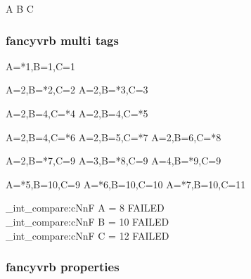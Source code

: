 \begin{CDRBlock} [
  tags=none,
  numbers=left,
  firstnumber=last,
]
A
B
C
\end{CDRBlock}
\ExplSyntaxOn
{}
\ExplSyntaxOff

\egroup

\subsubsection{\textsf{fancyvrb} multi tags}

\bgroup


\begin{CDRBlock} [
  tags={A,B,C},
  numbers=left,
  firstnumber=last,
]
A=*1,B=1,C=1
\end{CDRBlock}

\begin{CDRBlock} [
  tags={B,C},
  numbers=left,
  firstnumber=last,
]
A=2,B=*2,C=2
A=2,B=*3,C=3
\end{CDRBlock}

\begin{CDRBlock} [
  tags=C,
  numbers=left,
  firstnumber=last,
]
A=2,B=4,C=*4
A=2,B=4,C=*5
\end{CDRBlock}

\begin{CDRBlock} [
  tags={C, B},
  numbers=left,
  firstnumber=last,
]
A=2,B=4,C=*6
A=2,B=5,C=*7
A=2,B=6,C=*8
\end{CDRBlock}

\begin{CDRBlock} [
  tags={B, A},
  numbers=left,
  firstnumber=last,
]
A=2,B=*7,C=9
A=3,B=*8,C=9
A=4,B=*9,C=9
\end{CDRBlock}
\begin{CDRBlock} [
  tags={A,C},
  numbers=left,
  firstnumber=last,
]
A=*5,B=10,C=9
A=*6,B=10,C=10
A=*7,B=10,C=11
\end{CDRBlock}

\ExplSyntaxOn
\CDR_int_compare:cNnF { A } = 8 { FAILED \\ }
\CDR_int_compare:cNnF { B } = {10} { FAILED \\ }
\CDR_int_compare:cNnF { C } = {12} { FAILED \\ }
\ExplSyntaxOff

\egroup

\subsubsection{\textsf{fancyvrb} properties}

